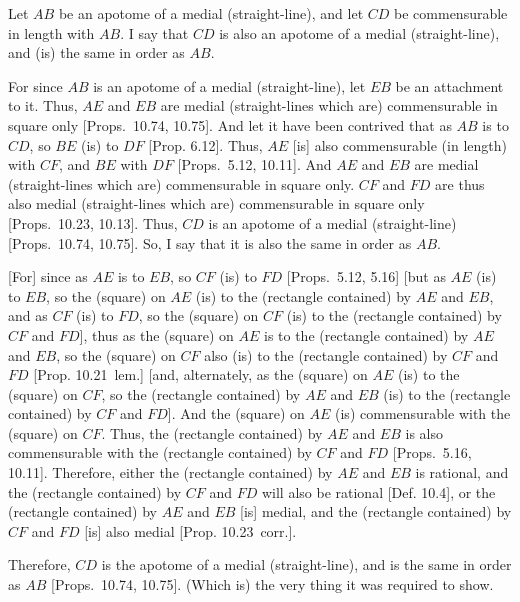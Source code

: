 \begin{Parallel}{}{}
{\epsfysize=0.7in
\centerline{}

Let $AB$ be an apotome of a medial (straight-line), and let $CD$
be commensurable in length with $AB$. I say that $CD$ is also an
apotome of a medial (straight-line), and (is) the same in order as $AB$.

For since $AB$ is an apotome of a medial (straight-line), let $EB$ be
an attachment to it. Thus, $AE$ and $EB$ are medial (straight-lines which are) commensurable in square only [Props.~10.74, 10.75]. And let it have been contrived that as
$AB$ is to $CD$, so $BE$ (is) to $DF$ [Prop. 6.12]. 
Thus, $AE$ [is] also commensurable (in length) with $CF$, and $BE$
with $DF$ [Props.~5.12, 10.11]. And $AE$ and $EB$ are medial (straight-lines which are) commensurable in square only. $CF$ and $FD$
are thus also medial (straight-lines which are) commensurable in square only
[Props.~10.23, 10.13]. 
Thus, $CD$ is an apotome of a medial (straight-line) [Props.~10.74, 10.75].
So, I say that it is also the same in order as $AB$.

\mbox{[}For] since as $AE$ is to $EB$, so $CF$ (is) to $FD$ [Props.~5.12, 5.16] [but
as $AE$ (is) to $EB$, so the (square) on $AE$ (is) to the (rectangle
contained) by $AE$ and $EB$, and as $CF$ (is) to $FD$, so the
(square) on $CF$ (is) to the (rectangle contained) by $CF$ and $FD$],
thus as  the (square) on $AE$ is to the (rectangle contained) by $AE$
and $EB$, so the (square) on $CF$ also (is) to the (rectangle contained)
by $CF$ and $FD$ [Prop. 10.21~lem.] [and,
alternately, as the (square) on $AE$ (is) to the (square) on $CF$, so
the (rectangle contained) by $AE$ and $EB$ (is) to the (rectangle contained)
by $CF$ and $FD$]. And the (square) on $AE$ (is) commensurable
with the (square) on $CF$. Thus, the (rectangle contained) by $AE$ and
$EB$ is also commensurable with the (rectangle contained) by $CF$ and
$FD$ [Props.~5.16, 10.11].
Therefore, either the (rectangle contained) by $AE$ and $EB$ is rational, and
the (rectangle contained) by $CF$ and $FD$ will also be rational [Def. 10.4], or
the (rectangle contained) by $AE$ and $EB$ [is] medial, and the
(rectangle contained) by $CF$ and $FD$ [is] also medial [Prop. 10.23~corr.].

Therefore, $CD$ is the apotome of a medial (straight-line), and is
the same in order as $AB$ [Props.~10.74, 10.75]. (Which is) the very thing it was required to show.}
\end{Parallel}

